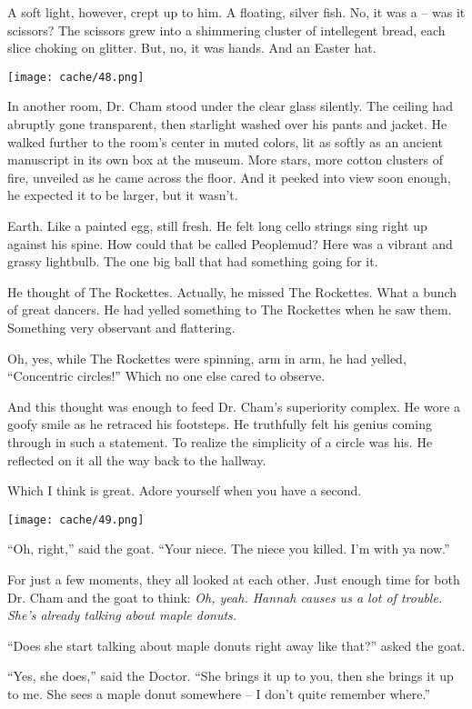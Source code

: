 \documentclass[12pt,twoside]{report}
\begin{document}
A soft light, however, crept up to him.  A floating, silver fish.  No,
it was a -- was it scissors? The scissors grew into a shimmering
cluster of intellegent bread, each slice choking on glitter. But, no,
it was hands.  And an Easter hat.

	\texttt{[image: cache/48.png]}

In another room, Dr. Cham stood under the clear glass silently.  The
ceiling had abruptly gone transparent, then starlight washed over his
pants and jacket.  He walked further to the room's center in muted
colors, lit as softly as an ancient manuscript in its own box at the
museum.  More stars, more cotton clusters of fire, unveiled as he came
across the floor. And it peeked into view soon enough, he expected it
to be larger, but it wasn't.

Earth.  Like a painted egg, still fresh.  He felt long cello strings
sing right up against his spine.  How could that be called Peoplemud?
Here was a vibrant and grassy lightbulb.  The one big ball that had
something going for it.

He thought of The Rockettes.  Actually, he missed The Rockettes.  What
a bunch of great dancers.  He had yelled something to The Rockettes
when he saw them.  Something very observant and flattering.

Oh, yes, while The Rockettes were spinning, arm in arm, he had yelled,
``Concentric circles!'' Which no one else cared to observe.

And this thought was enough to feed Dr. Cham's superiority complex.
He wore a goofy smile as he retraced his footsteps.  He truthfully
felt his genius coming through in such a statement.  To realize the
simplicity of a circle was his.  He reflected on it all the way back
to the hallway.

Which I think is great.  Adore yourself when you have a second.

	\texttt{[image: cache/49.png]}

``Oh, right,'' said the goat.  ``Your niece.  The niece you killed.
        I'm with ya now.''

For just a few moments, they all looked at each other.  Just enough
time for both Dr. Cham and the goat to think: {\em Oh, yeah.  Hannah
  causes us a lot of trouble.  She's already talking about maple
  donuts.}

``Does she start talking about maple donuts right away like that?''
asked the goat.

``Yes, she does,'' said the Doctor.  ``She brings it up to you, then
she brings it up to me.  She sees a maple donut somewhere -- I don't
quite remember where.''
\end{document}
